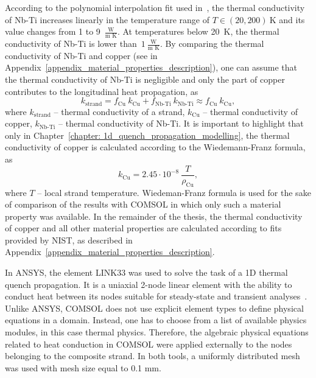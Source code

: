 According to the polynomial interpolation fit used in~\cite[p.~46]{material_props_for_heat_transfer_modelling_in_nb3sn_magnets}, the thermal conductivity of Nb-Ti increases linearly in the temperature range of $T \in (20, 200)~\text{K}$ and its value changes from 1 to 9~$\frac{\text{W}}{\text{m K}}$. At temperatures below 20~K, the thermal conductivity of Nb-Ti is lower than~$1~\frac{\text{W}}{\text{m K}}$. By comparing the thermal conductivity of Nb-Ti and copper (see in Appendix~\ref{appendix_material_properties_description}), one can assume that the thermal conductivity of Nb-Ti is negligible and only the part of copper contributes to the longitudinal heat propagation, as 
\begin{equation}
    k_\text{strand} = f_\text{Cu} ~ k_\text{Cu} + f_\text{Nb-Ti} ~ k_\text{Nb-Ti} \approx  f_\text{Cu} ~ k_\text{Cu},
    \label{eqn: k_equiv}
\end{equation}
where $k_\text{strand}$ -- thermal conductivity of a strand, $k_\text{Cu}$ -- thermal conductivity of copper, $k_\text{Nb-Ti}$ -- thermal conductivity of Nb-Ti. It is important to highlight that only in Chapter~\ref{chapter: 1d_quench_propagation_modelling}, the thermal conductivity of copper is calculated according to the Wiedemann-Franz formula, as
\begin{equation}
    k_\text{Cu} = 2.45 \cdot 10^{-8} ~ \frac{T}{\rho_\text{Cu}},
    \label{eqn: k_cu_wiedemann_franz}
\end{equation}
where $T$ -- local strand temperature. Wiedeman-Franz formula is used for the sake of comparison of the results with COMSOL in which only such a material property was available. In the remainder of the thesis, the thermal conductivity of copper and all other material properties are calculated according to fits provided by NIST, as described in Appendix~\ref{appendix_material_properties_description}. 

In ANSYS, the element LINK33 was used to solve the task of a 1D thermal quench propagation. It is a uniaxial 2-node linear element with the ability to conduct heat between its nodes suitable for steady-state and transient analyses~\cite{ansys_element_manual}. Unlike ANSYS, COMSOL does not use explicit element types to define physical equations in a domain. Instead, one has to choose from a list of available physics modules, in this case thermal physics. Therefore, the algebraic physical equations related to heat conduction in COMSOL were applied externally to the nodes belonging to the composite strand. In both tools, a uniformly distributed mesh was used with mesh size equal to 0.1 mm.

